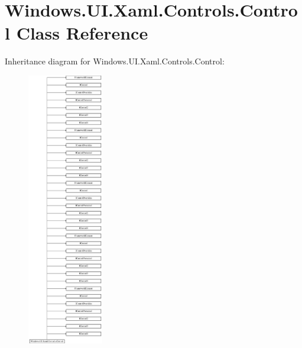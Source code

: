 \hypertarget{class_windows_1_1_u_i_1_1_xaml_1_1_controls_1_1_control}{}\section{Windows.\+U\+I.\+Xaml.\+Controls.\+Control Class Reference}
\label{class_windows_1_1_u_i_1_1_xaml_1_1_controls_1_1_control}
Inheritance diagram for Windows.\+U\+I.\+Xaml.\+Controls.\+Control\+:\begin{figure}[H]
\begin{center}
\leavevmode
\includegraphics[height=12.000000cm]{class_windows_1_1_u_i_1_1_xaml_1_1_controls_1_1_control}
\end{center}
\end{figure}
